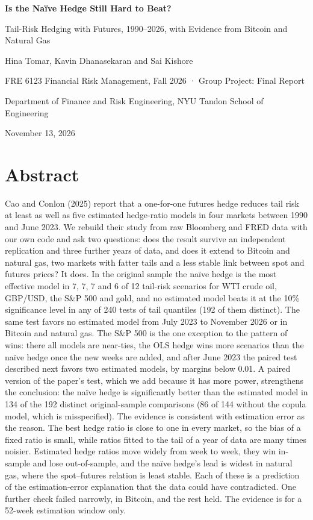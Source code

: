 \documentclass[11pt,letterpaper]{article}
\begin{document}
\begin{center}
{\LARGE\bfseries Is the Naïve Hedge Still Hard to Beat?\par}\vspace{4pt}
{\large Tail-Risk Hedging with Futures, 1990–2026, with Evidence from Bitcoin and Natural Gas\par}\vspace{10pt}
{Hina Tomar, Kavin Dhanasekaran and Sai Kishore\par}\vspace{2pt}
{\small FRE 6123 Financial Risk Management, Fall 2026 · Group Project: Final Report\par}
{\small Department of Finance and Risk Engineering, NYU Tandon School of Engineering\par}
{\small November 13, 2026\par}
\end{center}

\section*{Abstract}

Cao and Conlon (2025) report that a one-for-one futures hedge reduces tail risk at least as well as five estimated hedge-ratio models in four markets between 1990 and June 2023. We rebuild their study from raw Bloomberg and FRED data with our own code and ask two questions: does the result survive an independent replication and three further years of data, and does it extend to Bitcoin and natural gas, two markets with fatter tails and a less stable link between spot and futures prices? It does. In the original sample the naïve hedge is the most effective model in 7, 7, 7 and 6 of 12 tail-risk scenarios for WTI crude oil, GBP/USD, the S\&P 500 and gold, and no estimated model beats it at the 10\% significance level in any of 240 tests of tail quantiles (192 of them distinct). The same test favors no estimated model from July 2023 to November 2026 or in Bitcoin and natural gas. The S\&P 500 is the one exception to the pattern of wins: there all models are near-ties, the OLS hedge wins more scenarios than the naïve hedge once the new weeks are added, and after June 2023 the paired test described next favors two estimated models, by margins below 0.01. A paired version of the paper's test, which we add because it has more power, strengthens the conclusion: the naïve hedge is significantly better than the estimated model in 134 of the 192 distinct original-sample comparisons (86 of 144 without the copula model, which is misspecified). The evidence is consistent with estimation error as the reason. The best hedge ratio is close to one in every market, so the bias of a fixed ratio is small, while ratios fitted to the tail of a year of data are many times noisier. Estimated hedge ratios move widely from week to week, they win in-sample and lose out-of-sample, and the naïve hedge's lead is widest in natural gas, where the spot–futures relation is least stable. Each of these is a prediction of the estimation-error explanation that the data could have contradicted. One further check failed narrowly, in Bitcoin, and the rest held. The evidence is for a 52-week estimation window only.
\end{document}
